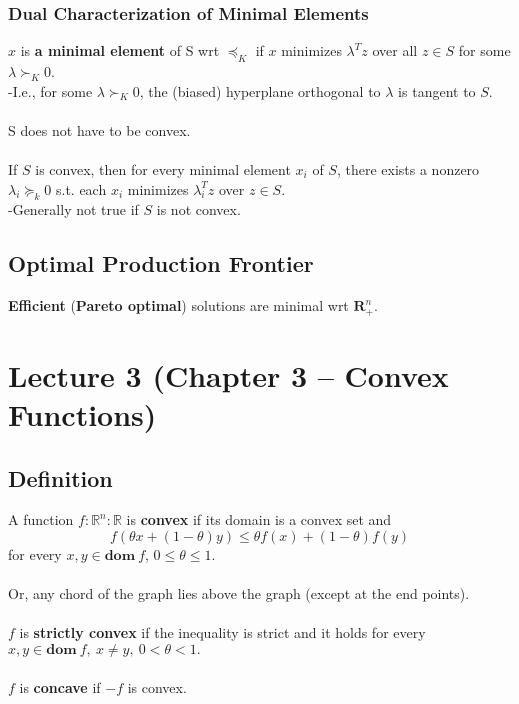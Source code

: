 \documentclass[]{article}
\begin{document}
\subsubsection*{Dual Characterization of Minimal Elements}
$x$ is \textbf{a minimal element} of S wrt $\preceq_{K}$ if $x$ minimizes $\lambda^{T}z$ over all $z \in S$ for some $\lambda \succ_{K} 0$. 
\\
-I.e., for some $\lambda \succ_{K} 0$, the (biased) hyperplane orthogonal to $\lambda$ is tangent to $S$. 
\\\\
S does not have to be convex.
\\\\
If $S$ is convex, then for every minimal element $x_{i}$ of $S$, there exists a nonzero $\lambda_{i} \succeq_{k} 0$ s.t. each $x_{i}$ minimizes $\lambda_{i}^{T}z$ over $z \in S.$
\\
-Generally not true if $S$ is not convex.
\\
\subsection*{Optimal Production Frontier}
\textbf{Efficient} (\textbf{Pareto optimal}) solutions are minimal wrt $\boldsymbol{R}^{n}_{+}$.\\

\section*{Lecture 3 (Chapter 3 -- Convex Functions)}
\subsection*{Definition}
A function $f:\mathbb{R}^{n} : \mathbb{R}$ is \textbf{convex} if its domain is a convex set and $$f(\theta x+(1-\theta)y) \leq \theta f(x) + (1-\theta) f(y)$$ for every $x,y \in \textbf{dom}\: f$, $0 \leq \theta \leq 1.$
\\\\
Or, any chord of the graph lies above the graph (except at the end points).
\\\\
$f$ is \textbf{strictly convex} if the inequality is strict and it holds for every $x,y \in \textbf{dom}\:f,\ x \neq y,\ 0 < \theta < 1.$
\\\\
$f$ is \textbf{concave} if $-f$ is convex.
\\
\end{document}
